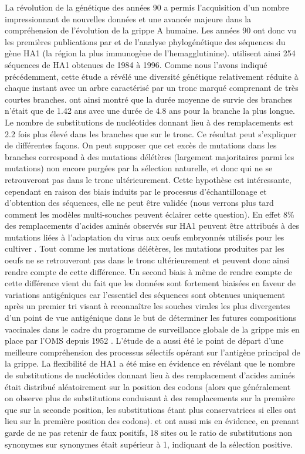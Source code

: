La révolution de la génétique des années 90 a permis l'acquisition
d'un nombre impressionnant de nouvelles données et une avancée majeure
dans la compréhension de l'évolution de la grippe A humaine. Les
années 90 ont donc vu les premières publications par \cite{Fitch1991}
et \citet{Fitch1997} de l'analyse phylogénétique des séquences du gène
HA1 (la région la plus immunogène de l'hemagglutinine).
\citet{Fitch1997} utilisent ainsi 254 séquences de HA1 obtenues de
1984 à 1996. Comme nous l'avons indiqué précédemment, cette étude a
révélé une diversité génétique relativement réduite à chaque instant
avec un arbre caractérisé par un tronc marqué comprenant de très
courtes branches. \citet{Fitch1997} ont ainsi montré que la durée
moyenne de survie des branches n'était que de 1.42 ans avec une durée
de 4.8 ans pour la branche la plus longue. Le nombre de substitutions
de nucléotides donnant lieu à des remplacements est 2.2 fois plus
élevé dans les branches que sur le tronc. Ce résultat peut s'expliquer
de différentes façons. On peut supposer que cet excès de mutations
dans les branches correspond à des mutations délétères (largement
majoritaires parmi les mutations) non encore purgées par la sélection
naturelle, et donc qui ne se retrouveront pas dans le tronc
ultérieurement. Cette hypothèse est intéressante, cependant en raison
des biais induits par le processus d'échantillonage et d'obtention des
séquences, elle ne peut être validée (nous verrons plus tard comment
les modèles multi-souches peuvent éclairer cette question). En effet
8\% des remplacements d'acides aminés observés sur HA1 peuvent être
attribués à des mutations liées à l'adaptation du virus aux oeufs
embryonnés utilisés pour les cultiver \citep{Bush2000}. Tout comme les
mutations délétères, les mutations produites par les oeufs ne se
retrouveront pas dans le tronc ultérieurement et peuvent donc ainsi
rendre compte de cette différence. Un second biais à même de rendre
compte de cette différence vient du fait que les données sont
fortement biaisées en faveur de variations antigéniques car
l'essentiel des séquences sont obtenues uniquement après un premier
tri visant à reconnaître les souches virales les plus divergentes d'un
point de vue antigénique dans le but de déterminer les futures
compositions vaccinales dans le cadre du programme de surveillance
globale de la grippe mis en place par l'OMS depuis 1952
\citep{Bush2000}. L'étude de \citet{Fitch1997} a aussi été le point de
départ d'une meilleure compréhension des processus sélectifs opérant
sur l'antigène principal de la grippe. La flexibilité de HA1 a été
mise en évidence en révélant que le nombre de substitutions de
nucléotides donnant lieu à des remplacement d'acides aminés était
distribué aléatoirement sur la position des codons (alors que
généralement on observe plus de substitutions conduisant à des
remplacements sur la première que sur la seconde position, les
substitutions étant plus conservatrices si elles ont lieu sur la
première position des codons). \citet{Fitch1997} et \citet{Bush1999}
ont aussi mis en évidence, en prenant garde de ne pas retenir de faux
positifs, 18 sites ou le ratio de substitutions non synonymes sur
synonymes était supérieur à 1, indiquant de la sélection positive.

